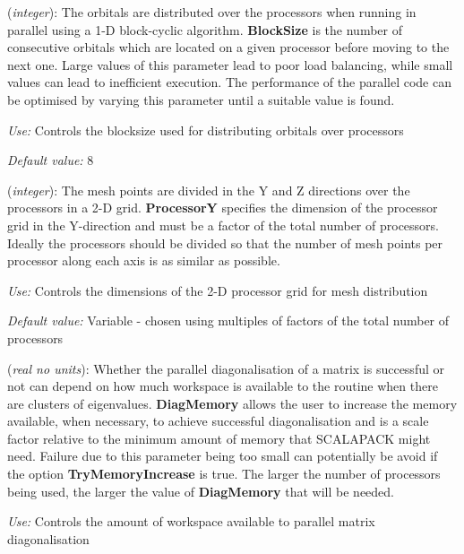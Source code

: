 \begin{description}
\itemsep 10pt
\parsep 0pt

\item[{\bf BlockSize}] ({\it integer}):
The orbitals are distributed over the processors when running in parallel
using a 1-D block-cyclic algorithm. {\bf BlockSize} is the number of
consecutive orbitals which are located on a given processor before
moving to the next one. Large values of this parameter lead to poor
load balancing, while small values can lead to inefficient execution.
The performance of the parallel code can be optimised by varying
this parameter until a suitable value is found.

{\it Use:} Controls the blocksize used for distributing orbitals over processors

{\it Default value:}  8

\item[{\bf ProcessorY}] ({\it integer}):
The mesh points are divided in the Y and Z directions over the processors
in a 2-D grid. {\bf ProcessorY} specifies the dimension of the processor
grid in the Y-direction and must be a factor of the total number of
processors. Ideally the processors should be divided so that the number
of mesh points per processor along each axis is as similar as possible.

{\it Use:} Controls the dimensions of the 2-D processor grid for mesh distribution

{\it Default value:}  Variable - chosen using multiples of factors of the total
  number of processors

\item[{\bf DiagMemory}] ({\it real no units}):
Whether the parallel diagonalisation of a matrix is successful or not can 
depend on how much workspace is available to the routine when there are
clusters of eigenvalues. {\bf DiagMemory} allows the user to increase
the memory available, when necessary, to achieve successful diagonalisation
and is a scale factor relative to the minimum amount of memory that
SCALAPACK might need. Failure due to this parameter being too small
can potentially be avoid if the option {\bf TryMemoryIncrease} is true.
The larger the number of processors being used, the larger the value of
{\bf DiagMemory} that will be needed.

{\it Use:} Controls the amount of workspace available to parallel matrix diagonalisation


\end{description}
